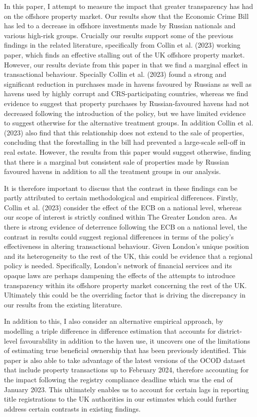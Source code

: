 \documentclass{article}
\begin{document}
In this paper, I attempt to measure the impact that greater transparency has had on the offshore property market. Our results show that the Economic Crime Bill has led to a decrease in offshore investments made by Russian nationals and various high-risk groups. Crucially our results support some of the previous findings in the related literature, specifically from Collin et al. (2023) working paper, which finds an effective stalling out of the UK offshore property market. However, our results deviate from this paper in that we find a marginal effect in transactional behaviour. Specially Collin et al. (2023) found a strong and significant reduction in purchases made in havens favoured by Russians as well as havens used by highly corrupt and CRS-participating countries, whereas we find evidence to suggest that property purchases by Russian-favoured havens had not decreased following the introduction of the policy, but we have limited evidence to suggest otherwise for the alternative treatment groups. In addition Collin et al. (2023) also find that this relationship does not extend to the sale of properties, concluding that the forestalling in the bill had prevented a large-scale sell-off in real estate. However, the results from this paper would suggest otherwise, finding that there is a marginal but consistent sale of properties made by Russian favoured havens in addition to all the treatment groups in our analysis. 

It is therefore important to discuss that the contrast in these findings can be partly attributed to certain methodological and empirical differences. Firstly, Collin et al. (2023) consider the effect of the ECB on a national level, whereas our scope of interest is strictly confined within The Greater London area. As there is strong evidence of deterrence following the ECB on a national level, the contrast in results could suggest regional differences in terms of the policy's effectiveness in altering transactional behaviour. Given London’s unique position and its heterogeneity to the rest of the UK, this could be evidence that a regional policy is needed. Specifically, London’s network of financial services and its opaque laws are perhaps dampening the effects of the attempts to introduce transparency within its offshore property market concerning the rest of the UK. Ultimately this could be the overriding factor that is driving the discrepancy in our results from the existing literature. 

In addition to this, I also consider an alternative empirical approach, by modelling a triple difference in difference estimation that accounts for district-level favourability in addition to the haven use, it uncovers one of the limitations of estimating true beneficial ownership that has been previously identified. This paper is also able to take advantage of the latest versions of the OCOD dataset that include property transactions up to February 2024, therefore accounting for the impact following the registry compliance deadline which was the end of January 2023. This ultimately enables us to account for certain lags in reporting title registrations to the UK authorities in our estimates which could further address certain contrasts in existing findings.
\end{document}
